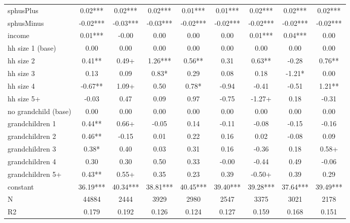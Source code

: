 {\begin{tabular}{l*{8}{c}}
sphusPlus   &        0.02***&        0.02***&        0.02***&        0.01***&        0.01***&        0.02***&        0.02***&        0.02***\\
sphusMinus  &       -0.02***&       -0.03***&       -0.03***&       -0.02***&       -0.02***&       -0.02***&       -0.02***&       -0.02***\\
income      &        0.01***&       -0.00   &        0.00   &        0.00   &        0.00   &        0.01***&        0.04***&        0.00   \\
hh size 1 (base)&        0.00   &        0.00   &        0.00   &        0.00   &        0.00   &        0.00   &        0.00   &        0.00   \\
hh size 2   &        0.41** &        0.49+  &        1.26***&        0.56** &        0.31   &        0.63** &       -0.28   &        0.76** \\
hh size 3   &        0.13   &        0.09   &        0.83*  &        0.29   &        0.08   &        0.18   &       -1.21*  &        0.00   \\
hh size 4   &       -0.67** &        1.09+  &        0.50   &        0.78*  &       -0.94   &       -0.41   &       -0.51   &        1.21** \\
hh size 5+  &       -0.03   &        0.47   &        0.09   &        0.97   &       -0.75   &       -1.27+  &        0.18   &       -0.31   \\
no grandchild (base)&        0.00   &        0.00   &        0.00   &        0.00   &        0.00   &        0.00   &        0.00   &        0.00   \\
grandchildren 1&        0.44** &        0.66+  &       -0.05   &        0.14   &       -0.11   &       -0.08   &       -0.15   &       -0.16   \\
grandchildren 2&        0.46** &       -0.15   &        0.01   &        0.22   &        0.16   &        0.02   &       -0.08   &        0.09   \\
grandchildren 3&        0.38*  &        0.40   &        0.03   &        0.31   &        0.16   &       -0.36   &        0.18   &        0.58+  \\
grandchildren 4&        0.30   &        0.30   &        0.50   &        0.33   &       -0.00   &       -0.44   &        0.49   &       -0.06   \\
grandchildren 5+&        0.43** &        0.55+  &        0.35   &        0.23   &        0.39   &       -0.50+  &        0.39   &        0.29   \\
constant    &       36.19***&       40.34***&       38.81***&       40.45***&       39.40***&       39.28***&       37.64***&       39.49***\\
\hline
N           &       44884   &        2444   &        3929   &        2980   &        2547   &        3375   &        3021   &        2178   \\
R2          &       0.179   &       0.192   &       0.126   &       0.124   &       0.127   &       0.159   &       0.168   &       0.151   \\
\hline\hline
\end{tabular}
}
